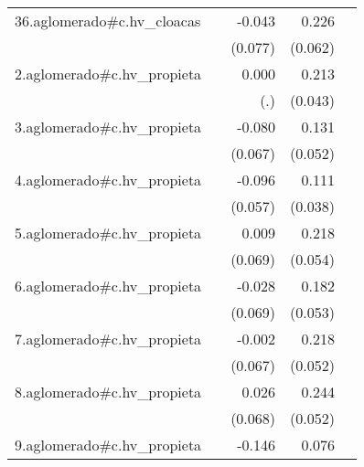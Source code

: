 {\begin{longtable}{l*{4}{D{.}{.}{-1}}}
\addlinespace
36.aglomerado#c.hv\_cloacas&                     &      -0.043         &       0.226\sym{***}&                     \\
            &                     &     (0.077)         &     (0.062)         &                     \\
\addlinespace
2.aglomerado#c.hv\_propieta&                     &       0.000         &       0.213\sym{***}&                     \\
            &                     &         (.)         &     (0.043)         &                     \\
\addlinespace
3.aglomerado#c.hv\_propieta&                     &      -0.080         &       0.131\sym{*}  &                     \\
            &                     &     (0.067)         &     (0.052)         &                     \\
\addlinespace
4.aglomerado#c.hv\_propieta&                     &      -0.096         &       0.111\sym{**} &                     \\
            &                     &     (0.057)         &     (0.038)         &                     \\
\addlinespace
5.aglomerado#c.hv\_propieta&                     &       0.009         &       0.218\sym{***}&                     \\
            &                     &     (0.069)         &     (0.054)         &                     \\
\addlinespace
6.aglomerado#c.hv\_propieta&                     &      -0.028         &       0.182\sym{***}&                     \\
            &                     &     (0.069)         &     (0.053)         &                     \\
\addlinespace
7.aglomerado#c.hv\_propieta&                     &      -0.002         &       0.218\sym{***}&                     \\
            &                     &     (0.067)         &     (0.052)         &                     \\
\addlinespace
8.aglomerado#c.hv\_propieta&                     &       0.026         &       0.244\sym{***}&                     \\
            &                     &     (0.068)         &     (0.052)         &                     \\
\addlinespace
9.aglomerado#c.hv\_propieta&                     &      -0.146         &       0.076         &                     \\

\end{longtable}}
